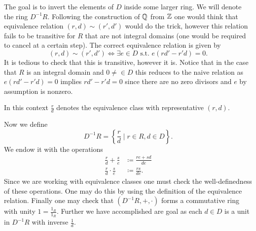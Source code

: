 \documentclass[master.tex]{subfiles}
\begin{document}
  The goal is to invert the elements of \(D\) inside some larger ring. We will denote the ring \(D^{-1}R\). Following
  the construction of \({\mathbb Q}\) from \({\mathbb Z}\) one would think that equivalence relation \((r,d)\sim (r',d')\) would do the
  trick, however this relation fails to be transitive for \(R\) that are not integral domains (one would be required to
  cancel at a certain step). The correct equivalence relation is given by
  \[(r,d) \sim (r',d') \iff \exists e \in D \text{ s.t. } e(rd'-r'd)=0. \] It is tedious to check that this is
  transitive, however it is. Notice that in the case that \(R\) is an integral domain and \(0 \neq \in D\) this reduces
  to the naive relation as \(e(rd'-r'd)=0\) implies \(rd'-r'd=0\) since there are no zero divisors and \(e\) by
  assumption is nonzero.

  \begin{notation}
    In this context \(\frac{r}{d}\) denotes the equivalence class with representative \((r,d)\).
  \end{notation}

  Now we define
  \[D^{-1}R= \left\{\frac{r}{d} \mid r \in R, d \in D\right\}.\] We endow it with the operations
  \begin{align*}
    \frac{r}{d}+\frac{s}{e} &\coloneqq \frac{re+sd}{de}\\
    \frac{r}{d}\cdot\frac{s}{e} &\coloneqq \frac{rs}{de}.
  \end{align*}
  Since we are working with equivalence classes one must check the well-definedness of these operations. One may do this
  by using the definition of the equivalence relation. Finally one may check that \((D^{-1}R,+,\cdot)\) forms a
  commutative ring with unity \(1=\frac{1_R}{1_R}\). Further we have accomplished are goal as each \(d \in D\) is a unit
  in \(D^{-1}R\) with inverse \(\frac{1}{d}\).
\end{document}
